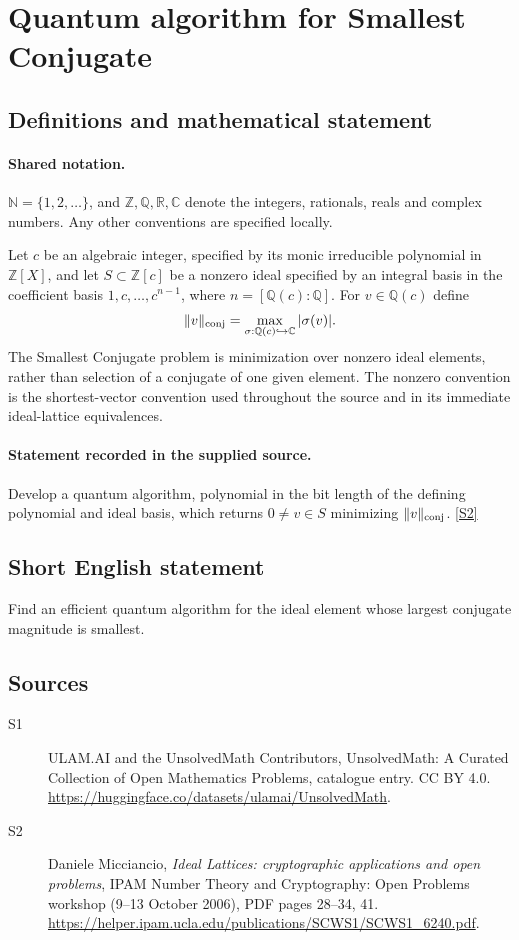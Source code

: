 \documentclass[11pt]{article}
\newcommand{\sref}[2]{\hyperlink{source:#1:#2}{[S#2]}}
\begin{document}
\section{Quantum algorithm for Smallest Conjugate}\label{statement}

\subsection{Definitions and mathematical statement}

\paragraph{Shared notation.}$\mathbb N=\{1,2,\ldots\}$, and $\mathbb Z,\mathbb Q,\mathbb R,\mathbb C$ denote the integers, rationals, reals and complex numbers. Any other conventions are specified locally.


Let $c$ be an algebraic integer, specified by its monic irreducible polynomial in $\mathbb Z[X]$, and let $S\subset\mathbb Z[c]$ be a nonzero ideal specified by an integral basis in the coefficient basis $1,c,\ldots,c^{n-1}$, where $n=[\mathbb Q(c):\mathbb Q]$. For $v\in\mathbb Q(c)$ define
\[
\|v\|_{\rm conj}=\max_{\sigma:\mathbb Q(c)\hookrightarrow\mathbb C}|\sigma(v)|.
\]
The Smallest Conjugate problem is minimization over nonzero ideal elements, rather than selection of a conjugate of one given element. The nonzero convention is the shortest-vector convention used throughout the source and in its immediate ideal-lattice equivalences.
\paragraph{Statement recorded in the supplied source.}
Develop a quantum algorithm, polynomial in the bit length of the defining polynomial and ideal basis, which returns $0\ne v\in S$ minimizing $\|v\|_{\rm conj}$. \sref{statement}{2}

\subsection{Short English statement}
Find an efficient quantum algorithm for the ideal element whose largest conjugate magnitude is smallest.
\subsection{Sources}
\begin{description}
\item[\hypertarget{source:statement:1}{S1}] ULAM.AI and the UnsolvedMath Contributors, UnsolvedMath: A Curated Collection of Open Mathematics Problems, catalogue entry. CC BY 4.0. \url{https://huggingface.co/datasets/ulamai/UnsolvedMath}.
\item[\hypertarget{source:statement:2}{S2}] Daniele Micciancio, \emph{Ideal Lattices: cryptographic applications and open problems}, IPAM Number Theory and Cryptography: Open Problems workshop (9--13 October 2006), PDF pages 28--34, 41. \url{https://helper.ipam.ucla.edu/publications/SCWS1/SCWS1_6240.pdf}.
\end{description}
\label{end:statement}
\end{document}
